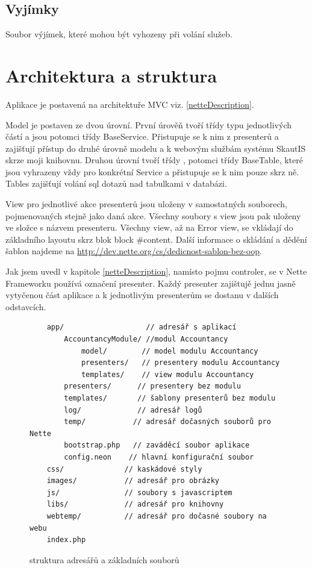 \documentclass[thesis=B,czech]{FITthesis}[2011/06/14]
\begin{document}
\subsection{Vyjímky}
Soubor výjímek, které mohou být vyhozeny při volání služeb.

\section{Architektura a struktura}
Aplikace je postavená na architektuře MVC viz. \ref{netteDescription}.

Model je postaven ze dvou úrovní. První úrověň tvoří třídy typu  jednotlivých částí a jsou potomci třídy BaseService. Přistupuje se k nim z presenterů a zajišťují přístup do druhé úrovně modelu a k webovým službám systému SkautIS skrze moji knihovnu. Druhou úrovní tvoří třídy , potomci třídy BaseTable, které jsou vyhrazeny vždy pro konkrétní Service a přistupuje se k nim pouze skrz ně. Tables zajišťují volání sql dotazů nad tabulkami v databázi.

View pro jednotlivé akce presenterů jsou uloženy v samostatných souborech, pojmenovaných stejně jako daná akce. Všechny soubory s view jsou pak uloženy ve složce s názvem presenteru. Všechny view, až na Error view, se vkládají do základního layoutu  skrz blok {block \#content}. Další informace o skládání a dědění šablon najdeme na \url{http://dev.nette.org/cs/dedicnost-sablon-bez-oop}.

Jak jsem uvedl v kapitole \ref{netteDescription}, namísto pojmu controler, se v Nette Frameworku používá označení presenter. Každý presenter zajištujě jednu jasně vytyčenou část aplikace a k jednotlivým presenterům se dostanu v dalších odstavcích.

\begin{figure}[h]\centering
\begin{verbatim}
    app/                   // adresář s aplikací
        AccountancyModule/ //modul Accountancy
            model/        // model modulu Accountancy
            presenters/   // presentery modulu Accountancy
            templates/    // view modulu Accountancy
        presenters/      // presentery bez modulu
        templates/       // šablony presenterů bez modulu
        log/             // adresář logů
        temp/           // adresář dočasných souborů pro Nette
        bootstrap.php   // zaváděcí soubor aplikace
        config.neon    // hlavní konfigurační soubor
    css/              // kaskádové styly
    images/           // adresář pro obrázky
    js/               // soubory s javascriptem
    libs/             // adresář pro knihovny
    webtemp/          // adresář pro dočasné soubory na webu
    index.php
\end{verbatim}
\caption{struktura adresářů a základních souborů}\label{directoryStructure}
\end{figure}
\end{document}
